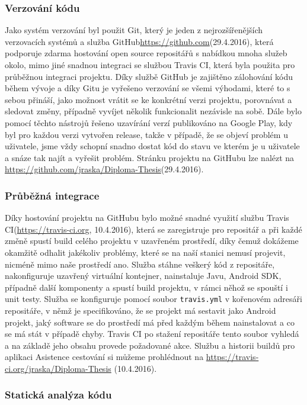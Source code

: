 \documentclass[czech,master,public,dept460,male,java,cpdeclaration]{diploma}
\begin{document}
 \subsubsection{Verzování kódu}
 Jako systém verzování byl použit Git, který je jeden z nejrozšířenějších verzovacích systémů a služba GitHub\url{https://github.com}(29.4.2016),
 která podporuje zdarma hostování open source repositářů s nabídkou mnoha služeb okolo, mimo jiné snadnou integraci se službou
 Travis CI, která byla použita pro průběžnou integraci projektu. Díky službě GitHub je zajištěno zálohování kódu
 během vývoje a díky Gitu je vyřešeno verzování se všemi výhodami, které to s sebou přináší, jako možnost vrátit se
 ke konkrétní verzi projektu, porovnávat a sledovat změny, případně vyvíjet několik funkcionalit nezávisle na sobě.
 Dále bylo pomocí těchto nástrojů řešeno uzavírání verzí publikováno na Google Play, kdy byl pro každou verzi vytvořen
 release, takže v případě, že se objeví problém u uživatele, jsme vždy schopní snadno dostat kód do stavu
 ve kterém je u uživatele a snáze tak najít a vyřešit problém. Stránku projektu na GitHubu lze nalézt na
 \url{https://github.com/jraska/Diploma-Thesis}(29.4.2016).

 \subsubsection{Průběžná integrace}
 Díky hostování projektu na GitHubu bylo možné snadné využití službu Travis CI(\url{https://travis-ci.org}, 10.4.2016),
 která se zaregistruje pro repositář
 a při každé změně spustí build celého projektu v uzavřeném prostředí, díky čemuž dokážeme okamžitě
 odhalit jakékoliv problémy, které se na naší stanici nemusí projevit, nicméně mimo naše prostředí ano.
 Služba stáhne veškerý kód z repositáře, nakonfiguruje uzavřený virtuální kontejner, nainstaluje Javu, Android SDK,
 případně další komponenty a spustí build projektu, v rámci něhož se spouští i unit testy. Služba se konfiguruje pomocí
 soubor \texttt{travis.yml} v kořenovém adresáři repositáře, v němž je specifikováno, že se projekt má sestavit jako Android projekt,
 jaký software se do prostředí má před každým během nainstalovat a co se má stát v případě chyby. Travis CI po stažení
 repositáře tento soubor vyhledá a na základě jeho obsahu provede požadované akce.
 Službu a historii buildů pro aplikaci Asistence cestování si můžeme prohlédnout na \url{https://travis-ci.org/jraska/Diploma-Thesis}  (10.4.2016).

 \subsubsection{Statická analýza kódu}
\end{document}
